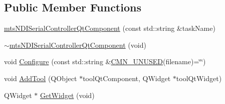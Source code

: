 \subsection*{Public Member Functions}
\begin{DoxyCompactItemize}
\item 
\hyperlink{classmts_n_d_i_serial_controller_qt_component_a6a049977126a130c6604509fc8da67bc}{mts\+N\+D\+I\+Serial\+Controller\+Qt\+Component} (const std\+::string \&task\+Name)
\item 
\hyperlink{classmts_n_d_i_serial_controller_qt_component_aa991fd9da8f3cc9f3c43306da82600ba}{$\sim$mts\+N\+D\+I\+Serial\+Controller\+Qt\+Component} (void)
\item 
void \hyperlink{classmts_n_d_i_serial_controller_qt_component_a27905059182decb564adc1b2fa904fe3}{Configure} (const std\+::string \&\hyperlink{cmn_portability_8h_a021894e2626935fa2305434b1e893ff6}{C\+M\+N\+\_\+\+U\+N\+U\+S\+E\+D}(filename)=\char`\"{}\char`\"{})
\item 
void \hyperlink{classmts_n_d_i_serial_controller_qt_component_a1da2ca165f8b294882a892d0ae0c4c4b}{Add\+Tool} (Q\+Object $\ast$tool\+Qt\+Component, Q\+Widget $\ast$tool\+Qt\+Widget)
\item 
Q\+Widget $\ast$ \hyperlink{classmts_n_d_i_serial_controller_qt_component_aa017ceba5024cff197f3a61c75ea4c4e}{Get\+Widget} (void)
\end{DoxyCompactItemize}
